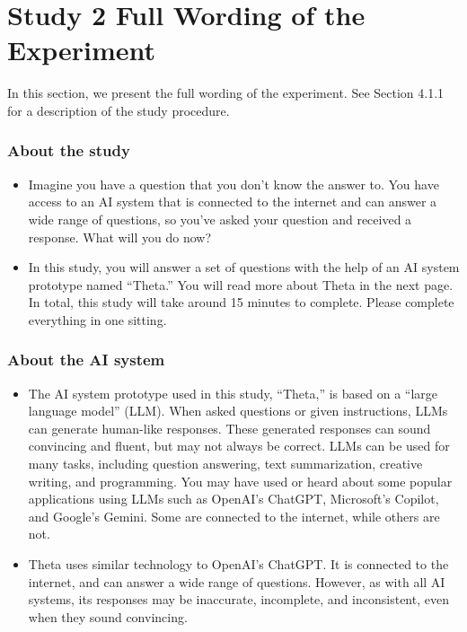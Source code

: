 \section{Study 2 Full Wording of the Experiment}
\label{app:study2wording}


In this section, we present the full wording of the experiment. See Section 4.1.1 for a description of the study procedure.


\subsubsection*{About the study}
\begin{itemize}
    \item Imagine you have a question that you don't know the answer to. You have access to an AI system that is connected to the internet and can answer a wide range of questions, so you've asked your question and received a response. What will you do now?

    \item In this study, you will answer a set of questions with the help of an AI system prototype named ``Theta.'' You will read more about Theta in the next page. In total, this study will take around 15 minutes to complete. Please complete everything in one sitting.
\end{itemize}



\subsubsection*{About the AI system}
\begin{itemize}
    \item The AI system prototype used in this study, ``Theta,''  is based on a ``large language model'' (LLM). When asked questions or given instructions, LLMs can generate human-like responses. These generated responses can sound convincing and fluent, but may not always be correct. LLMs can be used for many tasks, including question answering, text summarization, creative writing, and programming. You may have used or heard about some popular applications using LLMs such as OpenAI’s ChatGPT, Microsoft’s Copilot, and Google’s Gemini. Some are connected to the internet, while others are not.
    \item Theta uses similar technology to OpenAI’s ChatGPT. It is connected to the internet, and can answer a wide range of questions. However, as with all AI systems, its responses may be inaccurate, incomplete, and inconsistent, even when they sound convincing.
\end{itemize}


